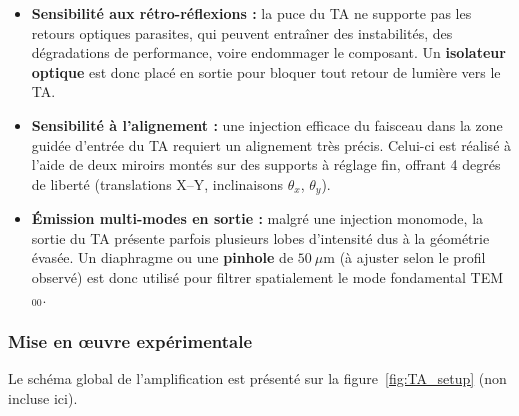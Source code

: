 \begin{itemize}[label=$\bullet$]
    \item \textbf{Sensibilité aux rétro-réflexions :} la puce du TA ne supporte pas les retours optiques parasites, qui peuvent entraîner des instabilités, des dégradations de performance, voire endommager le composant. Un \textbf{isolateur optique} est donc placé en sortie pour bloquer tout retour de lumière vers le TA.
    
    \item \textbf{Sensibilité à l’alignement :} une injection efficace du faisceau dans la zone guidée d’entrée du TA requiert un alignement très précis. Celui-ci est réalisé à l’aide de deux miroirs montés sur des supports à réglage fin, offrant 4 degrés de liberté (translations X–Y, inclinaisons $\theta_x$, $\theta_y$).
    
    \item \textbf{Émission multi-modes en sortie :} malgré une injection monomode, la sortie du TA présente parfois plusieurs lobes d’intensité dus à la géométrie évasée. Un diaphragme ou une \textbf{pinhole} de $50~\mu$m (à ajuster selon le profil observé) est donc utilisé pour filtrer spatialement le mode fondamental TEM$_{00}$.
\end{itemize}

\subsubsection*{Mise en œuvre expérimentale}

Le schéma global de l’amplification est présenté sur la figure~\ref{fig:TA_setup} (non incluse ici).

